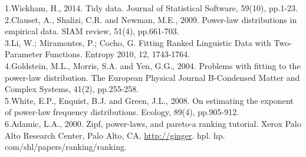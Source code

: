 \documentclass[
]{article}
\begin{document}
1.Wickham, H., 2014. Tidy data. Journal of Statistical Software, 59(10),
pp.1-23.\\
2.Clauset, A., Shalizi, C.R. and Newman, M.E., 2009. Power-law
distributions in empirical data. SIAM review, 51(4), pp.661-703.\\
3.Li, W.; Miramontes, P.; Cocho, G. Fitting Ranked Linguistic Data with
Two-Parameter Functions. Entropy 2010, 12, 1743-1764.\\
4.Goldstein, M.L., Morris, S.A. and Yen, G.G., 2004. Problems with
fitting to the power-law distribution. The European Physical Journal
B-Condensed Matter and Complex Systems, 41(2), pp.255-258.\\
5.White, E.P., Enquist, B.J. and Green, J.L., 2008. On estimating the
exponent of power‐law frequency distributions. Ecology, 89(4),
pp.905-912.\\
6.Adamic, L.A., 2000. Zipf, power-laws, and pareto-a ranking tutorial.
Xerox Palo Alto Research Center, Palo Alto, CA, \url{http://ginger}.
hpl. hp. com/shl/papers/ranking/ranking.\\
\end{document}
